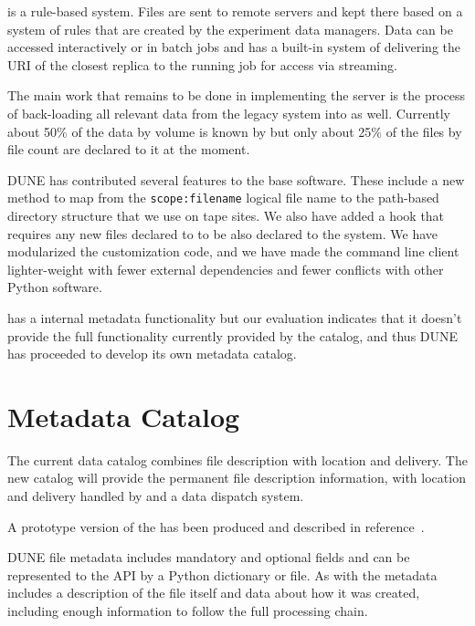 \documentclass[../main-v1.tex]{subfiles}
\begin{document}
 is a rule-based system.  Files are sent to remote servers and kept there based on a system of rules
that are created by the experiment data managers.  Data can be accessed interactively or in batch jobs and
 has a built-in system of delivering the URI of the closest replica to the running job for access via streaming.

The main work that remains to be done in implementing the  server is the process of back-loading all relevant 
data from the legacy  system into  as well.  Currently about 50\% of the data by volume is known by  but only about 25\% of the files by file count are declared to it at the moment. 

DUNE has contributed several features to the  base software.  These include a new method to map from the \texttt{scope:filename} logical file name to the path-based directory structure that we use on tape sites.  We also have added a hook that requires any new files declared to  to be also declared to the  system.  We have modularized the  customization code, and we have made the command line client lighter-weight with fewer external dependencies and fewer conflicts with other Python software. 

 has a internal metadata functionality but our evaluation indicates that it doesn't provide the full functionality currently provided by the  catalog, and thus DUNE has proceeded to develop its own metadata catalog. 

\section{Metadata Catalog }

The current  data catalog combines file description with location and delivery.  The new  catalog will provide the permanent file description information, with location and delivery handled by  and a data dispatch system. 

A prototype version of the  has been produced and described in reference~\cite{Mandrichenko:2021spd}. 

DUNE file metadata includes mandatory and optional fields and can be represented to the API by a Python dictionary or  file. 
As with  the metadata includes a description of the file itself and data about how it was created, including enough information to follow the full processing chain.   
\end{document}
